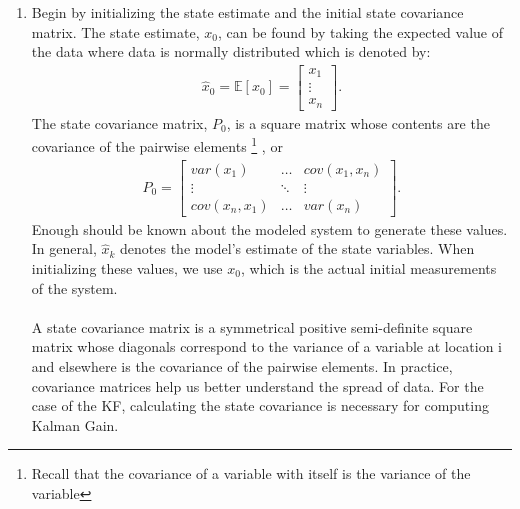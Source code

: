 \begin{enumerate}
  \item Begin by initializing the state estimate and the initial state covariance matrix. The state estimate, $x_0$, can be found by taking the expected value of the data where data is normally distributed which is denoted by:  
    \begin{align*}
       \hat x_0 = \mathbb{E}[x_0]  = \begin{bmatrix}
           x_1 \\
           \vdots \\
           x_n 
         \end{bmatrix} .
    \end{align*}
    The state covariance matrix, $P_0$, is a square matrix whose contents are the covariance of the pairwise elements
    \footnote{Recall that the covariance of a variable with itself is the variance of the variable}
    , or
    \begin{align*}
      P_0 =
      \begin{bmatrix}
           var(x_1)  & \hdots & cov(x_1,x_n) \\
           \vdots & \ddots & \vdots \\
           cov(x_n, x_1)  & \hdots & var(x_n )
         \end{bmatrix} .
  \end{align*}
  Enough should be known about the modeled system to generate these values. In general, $\hat x_k$ denotes the model's estimate of the state variables. When initializing these values, we use $x_0$, which is the actual initial measurements of the system. \\ \\
   A state covariance matrix is a symmetrical positive semi-definite square matrix whose diagonals correspond to the variance of a variable at location i and elsewhere is the covariance of the pairwise elements. In practice, covariance matrices help us better understand the spread of data. For the case of the KF, calculating the state covariance is necessary for computing Kalman Gain. 
   

\end{enumerate}
